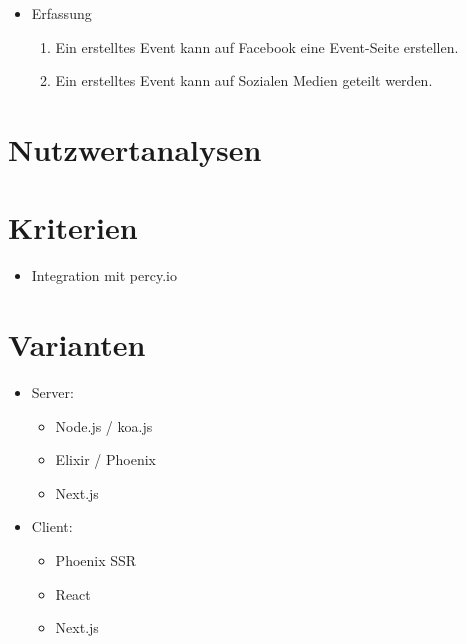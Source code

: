 \begin{itemize}
  \tightlist
  \item
        Erfassung
        \begin{enumerate}
          \def\labelenumi{\arabic{enumi}.}
          \tightlist
          \item
                Ein erstelltes Event kann auf Facebook eine Event-Seite erstellen.
          \item
                Ein erstelltes Event kann auf Sozialen Medien geteilt werden.
        \end{enumerate}
\end{itemize}

\section{Nutzwertanalysen}\label{nutzwertanalysen}

\section{Kriterien}\label{kriterien}

\begin{itemize}
  \tightlist
  \item
        Integration mit percy.io
\end{itemize}

\section{Varianten}\label{varianten}

\begin{itemize}
  \tightlist
  \item
        Server:
        \begin{itemize}
          \tightlist
          \item
                Node.js / koa.js
          \item
                Elixir / Phoenix
          \item
                Next.js
        \end{itemize}
\end{itemize}

\begin{itemize}
  \tightlist
  \item
        Client:
        \begin{itemize}
          \tightlist
          \item
                Phoenix SSR
          \item
                React
          \item
                Next.js
        \end{itemize}
\end{itemize}

